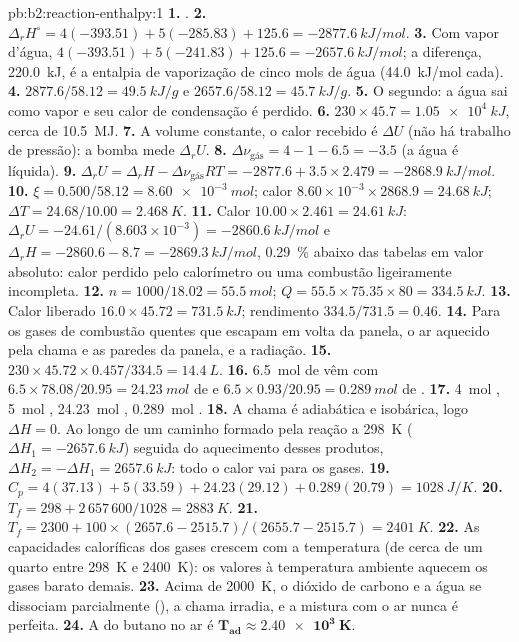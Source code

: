 \begin{solution}{pb:b2:reaction-enthalpy:1}
\textbf{1.} .
\textbf{2.} $\Delta_r H^\circ = 4(-393.51) + 5(-285.83) + 125.6 =
\qty{-2877.6}{kJ/mol}$.
\textbf{3.} Com vapor d'água, $4(-393.51) + 5(-241.83) + 125.6 =
\qty{-2657.6}{kJ/mol}$; a diferença, \qty{220.0}{kJ}, é a entalpia de
vaporização de cinco mols de água (\qty{44.0}{kJ/mol} cada).
\textbf{4.} $2877.6/58.12 = \qty{49.5}{kJ/g}$ e $2657.6/58.12 =
\qty{45.7}{kJ/g}$.
\textbf{5.} O segundo: a água sai como vapor e seu calor de condensação é
perdido.
\textbf{6.} $230 \times 45.7 = \qty{1.05e4}{kJ}$, cerca de \qty{10.5}{MJ}.
\textbf{7.} A volume constante, o calor recebido é $\Delta U$ (não há
trabalho de pressão): a bomba mede $\Delta_r U$.
\textbf{8.} $\Delta\nu_{\text{gás}} = 4 - 1 - 6.5 = -3.5$ (a água é
líquida).
\textbf{9.} $\Delta_r U = \Delta_r H - \Delta\nu_{\text{gás}}RT = -2877.6 +
3.5 \times 2.479 = \qty{-2868.9}{kJ/mol}$.
\textbf{10.} $\xi = 0.500/58.12 = \qty{8.60e-3}{mol}$; calor $8.60 \times
10^{-3} \times 2868.9 = \qty{24.68}{kJ}$; $\Delta T = 24.68/10.00 =
\qty{2.468}{K}$.
\textbf{11.} Calor $10.00 \times 2.461 = \qty{24.61}{kJ}$: $\Delta_r U =
-24.61/(8.603 \times 10^{-3}) = \qty{-2860.6}{kJ/mol}$ e $\Delta_r H =
-2860.6 - 8.7 = \qty{-2869.3}{kJ/mol}$, \qty{0.29}{\percent} abaixo das
tabelas em valor absoluto: calor perdido pelo calorímetro ou uma combustão
ligeiramente incompleta.
\textbf{12.} $n = 1000/18.02 = \qty{55.5}{mol}$; $Q = 55.5 \times 75.35
\times 80 = \qty{334.5}{kJ}$.
\textbf{13.} Calor liberado $16.0 \times 45.72 = \qty{731.5}{kJ}$; rendimento
$334.5/731.5 = 0.46$.
\textbf{14.} Para os gases de combustão quentes que escapam em volta da
panela, o ar aquecido pela chama e as paredes da panela, e a radiação.
\textbf{15.} $230 \times 45.72 \times 0.457/334.5 = \qty{14.4}{L}$.
\textbf{16.} \qty{6.5}{mol} de  vêm com $6.5 \times 78.08/20.95 =
\qty{24.23}{mol}$ de  e $6.5 \times 0.93/20.95 = \qty{0.289}{mol}$
de .
\textbf{17.} \qty{4}{mol} , \qty{5}{mol} ,
\qty{24.23}{mol} , \qty{0.289}{mol} .
\textbf{18.} A chama é adiabática e isobárica, logo $\Delta H = 0$. Ao longo
de um caminho formado pela reação a \qty{298}{K} ($\Delta H_1 =
\qty{-2657.6}{kJ}$) seguida do aquecimento desses produtos, $\Delta H_2 =
-\Delta H_1 = \qty{+2657.6}{kJ}$: todo o calor vai para os gases.
\textbf{19.} $C_p = 4(37.13) + 5(33.59) + 24.23(29.12) + 0.289(20.79) =
\qty{1028}{J/K}$.
\textbf{20.} $T_f = 298 + 2\,657\,600/1028 = \qty{2883}{K}$.
\textbf{21.} $T_f = 2300 + 100 \times (2657.6 - 2515.7)/(2655.7 - 2515.7) =
\qty{2401}{K}$.
\textbf{22.} As capacidades caloríficas dos gases crescem com a temperatura
(de cerca de um quarto entre \qty{298}{K} e \qty{2400}{K}): os valores à
temperatura ambiente aquecem os gases barato demais.
\textbf{23.} Acima de \qty{2000}{K}, o dióxido de carbono e a água se
dissociam parcialmente (), a chama irradia, e a mistura com o ar
nunca é perfeita.
\textbf{24.} A  do butano no ar é
$\boldsymbol{T_{\text{ad}} \approx \qty{2.40e3}{K}}$.
\end{solution}
